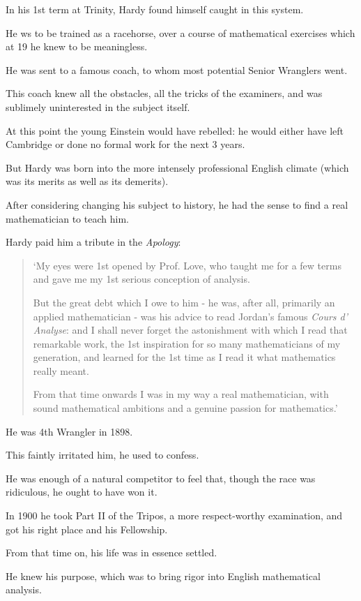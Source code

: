\documentclass{article}
\numberwithin{equation}{section}
\begin{document}
%
In his 1st term at Trinity, Hardy found himself caught in this system.

He ws to be trained as a racehorse, over a course of mathematical exercises which at 19 he knew to be meaningless.

He was sent to a famous coach, to whom most potential Senior Wranglers went.

This coach knew all the obstacles, all the tricks of the examiners, and was sublimely uninterested in the subject itself.

At this point the young Einstein would have rebelled: he would either have left Cambridge or done no formal work for the next 3 years.

But Hardy was born into the more intensely professional English climate (which was its merits as well as its demerits).

After considering changing his subject to history, he had the sense to find a real mathematician to teach him.

Hardy paid him a tribute in the \textit{Apology}:
\begin{quotation}
    `My eyes were 1st opened by Prof. Love, who taught me for a few terms and gave me my 1st serious conception of analysis.
    
    But the great debt which I owe to him - he was, after all, primarily an applied mathematician - was his advice to read Jordan's famous \textit{Cours d' Analyse}: and I shall never forget the astonishment with which I read that remarkable work, the 1st inspiration for so many mathematicians of my generation, and learned for the 1st time as I read it what mathematics really meant.
    
    From that time onwards I was in my way a real mathematician, with sound mathematical ambitions and a genuine passion for mathematics.'
\end{quotation}
He was 4th Wrangler in 1898.

This faintly irritated him, he used to confess.

He was enough of a natural competitor to feel that, though the race was ridiculous, he ought to have won it.

In 1900 he took Part II of the Tripos, a more respect-worthy examination, and got his right place and his Fellowship.

%
From that time on, his life was in essence settled.

He knew his purpose, which was to bring rigor into English mathematical analysis.
\end{document}
